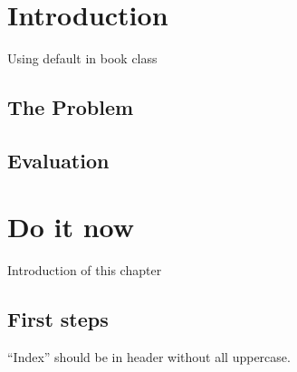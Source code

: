 \documentclass{book}
\begin{document}
\chapter{Introduction}

Using default in book class

\section{The Problem}
\label{sec:problem}

\lipsum[1]

\section{Evaluation}

\lipsum[2]

\chapter{Do it now}

Introduction of this chapter

\lipsum[3]

\section{First steps}
\label{sec:first-steps}

\lipsum
\printindex
\newpage
``Index'' should be in header without all uppercase.
\end{document}
